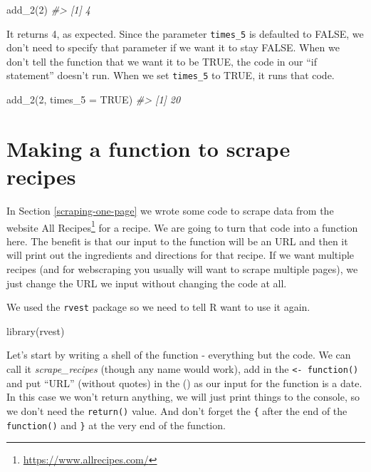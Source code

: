 \documentclass[
]{krantz}
\makeatletter
\newenvironment{Shaded}{\begin{snugshade}}{\end{snugshade}}
\newcommand{\AttributeTok}[1]{\textcolor[rgb]{0.61,0.61,0.61}{#1}}
\newcommand{\CommentTok}[1]{\textcolor[rgb]{0.37,0.37,0.37}{\textit{#1}}}
\newcommand{\ConstantTok}[1]{\textcolor[rgb]{0,0,0}{#1}}
\newcommand{\DecValTok}[1]{\textcolor[rgb]{0.06,0.06,0.06}{#1}}
\newcommand{\FunctionTok}[1]{\textcolor[rgb]{0,0,0}{#1}}
\newcommand{\NormalTok}[1]{#1}
\renewcommand{\href}[2]{#2\footnote{\url{#1}}}
\newenvironment{kframe}{%
\medskip{}
\setlength{\fboxsep}{.8em}
 \def\at@end@of@kframe{}%
 \ifinner\ifhmode%
  \def\at@end@of@kframe{\end{minipage}}%
  \begin{minipage}{\columnwidth}%
 \fi\fi%
 \def\FrameCommand##1{\hskip\@totalleftmargin \hskip-\fboxsep
 \colorbox{shadecolor}{##1}\hskip-\fboxsep
     \hskip-\linewidth \hskip-\@totalleftmargin \hskip\columnwidth}%
 \MakeFramed {\advance\hsize-\width
   \@totalleftmargin\z@ \linewidth\hsize
   \@setminipage}}%
 {\par\unskip\endMakeFramed%
 \at@end@of@kframe}
\renewenvironment{Shaded}{\begin{kframe}}{\end{kframe}}
\makeatother
\begin{document}
\begin{Shaded}
\begin{Highlighting}[]
\FunctionTok{add\_2}\NormalTok{(}\DecValTok{2}\NormalTok{)}
\CommentTok{\#\textgreater{} [1] 4}
\end{Highlighting}
\end{Shaded}

It returns 4, as expected. Since the parameter \texttt{times\_5} is defaulted to FALSE, we don't need to specify that parameter if we want it to stay FALSE. When we don't tell the function that we want it to be TRUE, the code in our ``if statement'' doesn't run. When we set \texttt{times\_5} to TRUE, it runs that code.

\begin{Shaded}
\begin{Highlighting}[]
\FunctionTok{add\_2}\NormalTok{(}\DecValTok{2}\NormalTok{, }\AttributeTok{times\_5 =} \ConstantTok{TRUE}\NormalTok{)}
\CommentTok{\#\textgreater{} [1] 20}
\end{Highlighting}
\end{Shaded}

\hypertarget{recipes-function}{%
\section{Making a function to scrape recipes}\label{recipes-function}}

In Section \ref{scraping-one-page} we wrote some code to scrape data from the website \href{https://www.allrecipes.com/}{All Recipes} for a recipe. We are going to turn that code into a function here. The benefit is that our input to the function will be an URL and then it will print out the ingredients and directions for that recipe. If we want multiple recipes (and for webscraping you usually will want to scrape multiple pages), we just change the URL we input without changing the code at all.

We used the \texttt{rvest} package so we need to tell R want to use it again.

\begin{Shaded}
\begin{Highlighting}[]
\FunctionTok{library}\NormalTok{(rvest)}
\end{Highlighting}
\end{Shaded}

Let's start by writing a shell of the function - everything but the code. We can call it \emph{scrape\_recipes} (though any name would work), add in the \texttt{\textless{}-\ function()} and put ``URL'' (without quotes) in the () as our input for the function is a date. In this case we won't return anything, we will just print things to the console, so we don't need the \texttt{return()} value. And don't forget the \texttt{\{} after the end of the \texttt{function()} and \texttt{\}} at the very end of the function.
\end{document}
